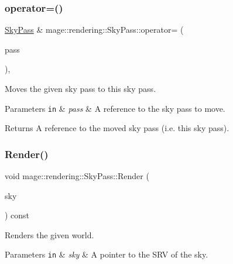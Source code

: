 \subsubsection{\texorpdfstring{operator=()}{operator=()}\hspace{0.1cm}{\footnotesize\ttfamily [2/2]}}
{\footnotesize\ttfamily \mbox{\hyperlink{classmage_1_1rendering_1_1_sky_pass}{Sky\+Pass}} \& mage\+::rendering\+::\+Sky\+Pass\+::operator= (\begin{DoxyParamCaption}\item[{\mbox{\hyperlink{classmage_1_1rendering_1_1_sky_pass}{Sky\+Pass}} \&\&}]{pass }\end{DoxyParamCaption})\hspace{0.3cm}{\ttfamily [default]}, {\ttfamily [noexcept]}}

Moves the given sky pass to this sky pass.


\begin{DoxyParams}[1]{Parameters}
\mbox{\tt in}  & {\em pass} & A reference to the sky pass to move. \\
\hline
\end{DoxyParams}
\begin{DoxyReturn}{Returns}
A reference to the moved sky pass (i.\+e. this sky pass). 
\end{DoxyReturn}
\mbox{\label{classmage_1_1rendering_1_1_sky_pass_a94b9ca7b1a02b6f6730584ec80adb84a}} 
\subsubsection{\texorpdfstring{Render()}{Render()}}
{\footnotesize\ttfamily void mage\+::rendering\+::\+Sky\+Pass\+::\+Render (\begin{DoxyParamCaption}\item[{I\+D3\+D11\+Shader\+Resource\+View $\ast$}]{sky }\end{DoxyParamCaption}) const\hspace{0.3cm}{\ttfamily [noexcept]}}

Renders the given world.


\begin{DoxyParams}[1]{Parameters}
\mbox{\tt in}  & {\em sky} & A pointer to the S\+RV of the sky. \\
\hline
\end{DoxyParams}


